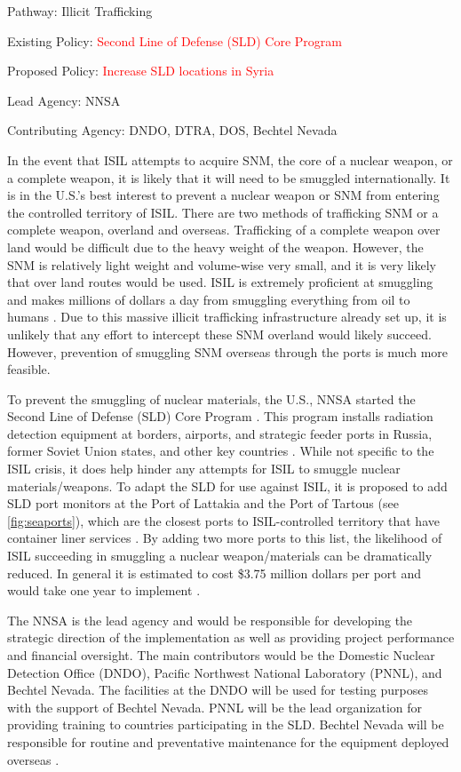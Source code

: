 \documentclass{report}
\begin{document}
Pathway: Illicit Trafficking 

Existing Policy: \textcolor{red}{Second Line of Defense (SLD) Core Program} 

Proposed Policy: \textcolor{red}{Increase SLD locations in Syria}

Lead Agency: NNSA

Contributing Agency: DNDO, DTRA, DOS, Bechtel Nevada  \normalfont



In the event that ISIL attempts to acquire SNM, the core of a nuclear weapon, or a complete weapon, it is likely that it will need to be smuggled internationally. It is in the U.S.'s best interest to prevent a nuclear weapon or SNM from entering the controlled territory of ISIL. There are two methods of trafficking SNM or a complete weapon, overland and overseas. Trafficking of a complete weapon over land would be difficult due to the heavy weight of the weapon. However, the SNM is relatively light weight and volume-wise very small, and it is very likely that over land routes would be used. ISIL is extremely proficient at smuggling and makes millions of dollars a day from smuggling everything from oil to humans \cite{Amos2014}. Due to this massive illicit trafficking infrastructure already set up, it is unlikely that any effort to intercept these SNM overland would likely succeed. However, prevention of smuggling SNM overseas through the ports is much more feasible. 

To prevent the smuggling of nuclear materials, the U.S., NNSA started the Second Line of Defense (SLD) Core Program  \cite{Kilmartin2010}. This program installs radiation detection equipment at borders, airports, and strategic feeder ports in Russia, former Soviet Union states, and other key countries \cite{Kilmartin2010}. While not specific to the ISIL crisis, it does help hinder any attempts for ISIL to smuggle nuclear materials/weapons. To adapt the SLD for use against ISIL, it is proposed to add SLD port monitors at the Port of Lattakia and the Port of Tartous (see \autoref{fig:seaports}), which are the closest ports to ISIL-controlled territory that have container liner services \cite{WorldPortSource2005}.  By adding two more ports to this list, the likelihood of ISIL succeeding in smuggling a nuclear weapon/materials can be dramatically reduced. In general it is estimated to cost \$3.75 million dollars per port and would take one year to implement \cite{Aloise2005}. 

The NNSA is the lead agency and would be responsible for developing the strategic direction of the implementation as well as providing project performance and financial oversight. The main contributors would be the Domestic Nuclear Detection Office (DNDO), Pacific Northwest National Laboratory (PNNL), and Bechtel Nevada. The facilities at the DNDO will be used for testing purposes with the support of Bechtel Nevada. PNNL will be the lead organization for providing training to countries participating in the SLD. Bechtel Nevada will be responsible for routine and preventative maintenance for the equipment deployed overseas \cite{NationalNuclearSecurityAdministration2006}. 
\end{document}
